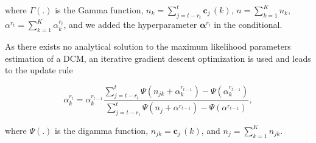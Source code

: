 where $\Gamma(.)$ is the Gamma function, $n_k=\sum_{j=t-r_t}^t
\mathbf{c}_j\,(k)$, $n=\sum_{k=1}^K n_k$,
$\alpha^{r_t}=\sum_{k=1}^K\alpha^{r_t}_k$, and we added the hyperparameter
$\boldsymbol{\alpha}^{r_t}$ in the conditional.

As there exists no analytical solution to the maximum likelihood parameters
estimation of a DCM, an iterative gradient descent optimization is used and
leads to the update rule

\begin{equation}
\label{eqn:alpha_update}
\alpha_k^{r_t} = \alpha^{r_{t-1}}_k\frac{\sum_{j=t-r_t}^t\Psi(n_{jk}+
\alpha^{r_{t-1}}_k)-\Psi(\alpha^{r_{t-1}}_k)}{\sum_{j=t-r_t}^t\Psi(n_j+
\alpha^{r_{t-1}})-\Psi(\alpha^{r_{t-1}})},
\end{equation}

where $\Psi(.)$ is the digamma function, $n_{jk}=\mathbf{c}_j\,(k)$, and
$n_j=\sum_{k=1}^K n_{jk}$.
